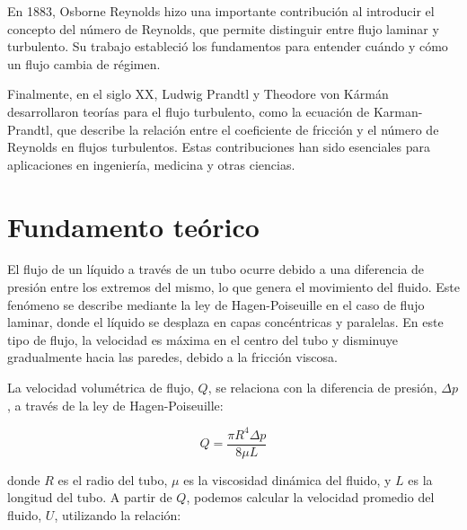 	\vspace{\baselineskip}
	
	En 1883, Osborne Reynolds hizo una importante contribución  al introducir el concepto del número de Reynolds, que permite distinguir entre flujo laminar y turbulento. Su trabajo estableció los fundamentos para entender cuándo y cómo un flujo cambia de régimen.
	
	\vspace{\baselineskip}
	
	Finalmente, en el siglo XX, Ludwig Prandtl y Theodore von Kármán desarrollaron teorías para el flujo turbulento, como la ecuación de Karman-Prandtl, que describe la relación entre el coeficiente de fricción y el número de Reynolds en flujos turbulentos. Estas contribuciones han sido esenciales para aplicaciones en ingeniería, medicina y otras ciencias.
	
	
	
	\section{Fundamento teórico}
	
	El flujo de un líquido a través de un tubo ocurre debido a una diferencia de presión entre los extremos del mismo, lo que genera el movimiento del fluido. Este fenómeno se describe mediante la ley de Hagen-Poiseuille en el caso de flujo laminar, donde el líquido se desplaza en capas concéntricas y paralelas. En este tipo de flujo, la velocidad es máxima en el centro del tubo y disminuye gradualmente hacia las paredes, debido a la fricción viscosa.
	
	\vspace{\baselineskip}
	
	La velocidad volumétrica de flujo, \( Q \), se relaciona con la diferencia de presión, \( \Delta p \), a través de la ley de Hagen-Poiseuille:
	
	\vspace{\baselineskip}
	
	\begin{equation}
		Q = \frac{\pi R^4 \Delta p}{8 \mu L}
		\label{eq:hagen_poiseuille}
	\end{equation}
	
	\vspace{\baselineskip}
	
	donde \( R \) es el radio del tubo, \( \mu \) es la viscosidad dinámica del fluido, y \( L \) es la longitud del tubo. A partir de \( Q \), podemos calcular la velocidad promedio del fluido, \( U \), utilizando la relación:
	
